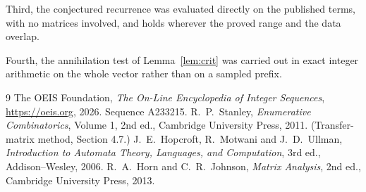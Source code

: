 \documentclass[11pt,a4paper]{article}
\theoremstyle{plain}
\theoremstyle{definition}
\begin{document}
Third, the conjectured recurrence was evaluated directly on the published terms, with no
matrices involved, and holds wherever the proved range and the data overlap.

Fourth, the annihilation test of Lemma~\ref{lem:crit} was carried out in exact integer
arithmetic on the whole vector rather than on a sampled prefix.

\begin{thebibliography}{9}
 The OEIS Foundation, \emph{The On-Line Encyclopedia of Integer
Sequences}, \url{https://oeis.org}, 2026. Sequence A233215.
 R.~P.~Stanley, \emph{Enumerative Combinatorics}, Volume 1, 2nd ed.,
Cambridge University Press, 2011. (Transfer-matrix method, Section 4.7.)
 J.~E.~Hopcroft, R.~Motwani and J.~D.~Ullman, \emph{Introduction to Automata
Theory, Languages, and Computation}, 3rd ed., Addison--Wesley, 2006.
 R.~A.~Horn and C.~R.~Johnson, \emph{Matrix Analysis}, 2nd ed., Cambridge
University Press, 2013.
\end{thebibliography}
\end{document}

